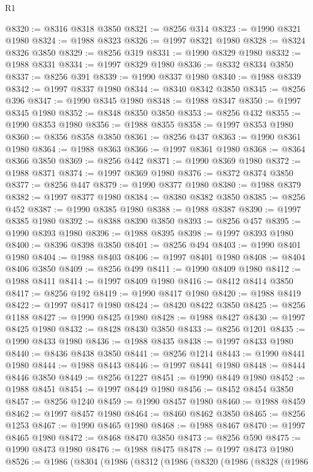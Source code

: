\begin{lexlean}{R1}
\begin{coremodule}
@8320 := @8316 @8318 @3850
@8321 := @8256 @314
@8323 := @1990 @8321 @1980
@8324 := @1988 @8323
@8326 := @1997 @8321 @1980
@8328 := @8324 @8326 @3850
@8329 := @8256 @319
@8331 := @1990 @8329 @1980
@8332 := @1988 @8331
@8334 := @1997 @8329 @1980
@8336 := @8332 @8334 @3850
@8337 := @8256 @391
@8339 := @1990 @8337 @1980
@8340 := @1988 @8339
@8342 := @1997 @8337 @1980
@8344 := @8340 @8342 @3850
@8345 := @8256 @396
@8347 := @1990 @8345 @1980
@8348 := @1988 @8347
@8350 := @1997 @8345 @1980
@8352 := @8348 @8350 @3850
@8353 := @8256 @432
@8355 := @1990 @8353 @1980
@8356 := @1988 @8355
@8358 := @1997 @8353 @1980
@8360 := @8356 @8358 @3850
@8361 := @8256 @437
@8363 := @1990 @8361 @1980
@8364 := @1988 @8363
@8366 := @1997 @8361 @1980
@8368 := @8364 @8366 @3850
@8369 := @8256 @442
@8371 := @1990 @8369 @1980
@8372 := @1988 @8371
@8374 := @1997 @8369 @1980
@8376 := @8372 @8374 @3850
@8377 := @8256 @447
@8379 := @1990 @8377 @1980
@8380 := @1988 @8379
@8382 := @1997 @8377 @1980
@8384 := @8380 @8382 @3850
@8385 := @8256 @452
@8387 := @1990 @8385 @1980
@8388 := @1988 @8387
@8390 := @1997 @8385 @1980
@8392 := @8388 @8390 @3850
@8393 := @8256 @457
@8395 := @1990 @8393 @1980
@8396 := @1988 @8395
@8398 := @1997 @8393 @1980
@8400 := @8396 @8398 @3850
@8401 := @8256 @494
@8403 := @1990 @8401 @1980
@8404 := @1988 @8403
@8406 := @1997 @8401 @1980
@8408 := @8404 @8406 @3850
@8409 := @8256 @499
@8411 := @1990 @8409 @1980
@8412 := @1988 @8411
@8414 := @1997 @8409 @1980
@8416 := @8412 @8414 @3850
@8417 := @8256 @192
@8419 := @1990 @8417 @1980
@8420 := @1988 @8419
@8422 := @1997 @8417 @1980
@8424 := @8420 @8422 @3850
@8425 := @8256 @1188
@8427 := @1990 @8425 @1980
@8428 := @1988 @8427
@8430 := @1997 @8425 @1980
@8432 := @8428 @8430 @3850
@8433 := @8256 @1201
@8435 := @1990 @8433 @1980
@8436 := @1988 @8435
@8438 := @1997 @8433 @1980
@8440 := @8436 @8438 @3850
@8441 := @8256 @1214
@8443 := @1990 @8441 @1980
@8444 := @1988 @8443
@8446 := @1997 @8441 @1980
@8448 := @8444 @8446 @3850
@8449 := @8256 @1227
@8451 := @1990 @8449 @1980
@8452 := @1988 @8451
@8454 := @1997 @8449 @1980
@8456 := @8452 @8454 @3850
@8457 := @8256 @1240
@8459 := @1990 @8457 @1980
@8460 := @1988 @8459
@8462 := @1997 @8457 @1980
@8464 := @8460 @8462 @3850
@8465 := @8256 @1253
@8467 := @1990 @8465 @1980
@8468 := @1988 @8467
@8470 := @1997 @8465 @1980
@8472 := @8468 @8470 @3850
@8473 := @8256 @590
@8475 := @1990 @8473 @1980
@8476 := @1988 @8475
@8478 := @1997 @8473 @1980
@8526 := @1986
    (@8304
      (@1986
        (@8312
          (@1986
            (@8320
              (@1986
                (@8328
                  (@1986

\end{coremodule}
\end{lexlean}
